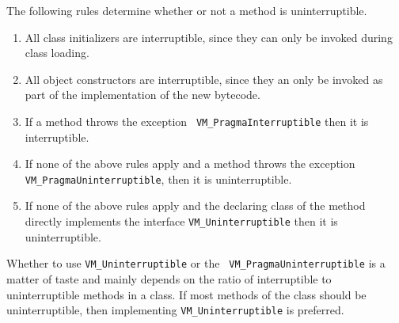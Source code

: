 The following rules determine whether or not a method is
uninterruptible.
\begin{enumerate}
\item{} All class initializers are interruptible, since they
can only be invoked during class loading.
\item{} All object constructors are interruptible, since they an
only be invoked as part of the implementation of the new bytecode.
\item{} If a method throws the exception {\tt
VM\_PragmaInterruptible} then it is interruptible.
\item{} If none of the above rules apply and a method throws the
exception {\tt VM\_PragmaUninterruptible}, then it is uninterruptible.
\item{} If none of the above rules apply and the declaring class of
the method directly implements the interface {\tt VM\_Uninterruptible}
then it is uninterruptible.
\end{enumerate}
Whether to use {\tt VM\_Uninterruptible} or the {\tt
VM\_PragmaUninterruptible} is a matter of taste and mainly depends on
the ratio of interruptible to uninterruptible methods in a class.  If
most methods of the class should be uninterruptible, then implementing
{\tt VM\_Uninterruptible} is preferred. 

\JavaTMFooter
